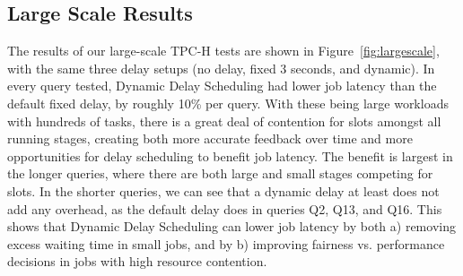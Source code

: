 \subsection{Large Scale Results}

The results of our large-scale TPC-H tests are shown in Figure~\ref{fig:largescale}, with the same three 
delay setups (no delay, fixed 3 seconds, and dynamic). In every query tested, Dynamic Delay
Scheduling had lower job latency than the default fixed delay, by roughly 10\% per query. With
these being large workloads with hundreds of tasks, there is a great deal of contention for
slots amongst all running stages, creating both more accurate feedback over time and
more opportunities for delay scheduling to benefit job latency. The benefit is largest
in the longer queries, where there are both large and small stages competing for slots.
In the shorter queries, we can see that a dynamic delay at least does not add any overhead,
as the default delay does in queries Q2, Q13, and Q16. This shows that Dynamic Delay Scheduling
can lower job latency by both a) removing excess waiting time in small jobs, and by b) 
improving fairness vs. performance decisions in jobs with high resource contention.



